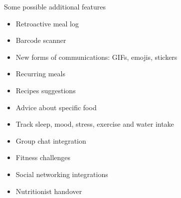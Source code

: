 \documentclass[landscape]{infslides}
\begin{document}
\begin{slide}{Some possible additional features}
    \begin{itemize}\shrinklist
        \item Retroactive meal log
        \item Barcode scanner
        \item New forms of communications: GIFs, emojis, stickers
        \item Recurring meals
        \item Recipes suggestions
        \item Advice about specific food
        \item Track sleep, mood, stress, exercise and water intake
        \item Group chat integration
        \item Fitness challenges
        \item Social networking integrations
        \item Nutritionist handover
    \end{itemize}
\end{slide}
\end{document}
